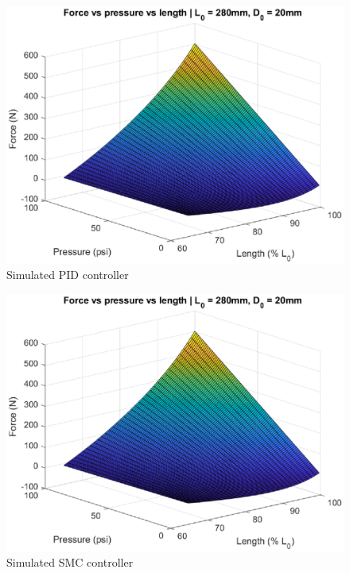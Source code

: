 \documentclass[11pt,a4paper]{article}
\begin{document}
\begin{figure}[!hbt]
    \centering
    \includegraphics[scale=0.8]{staticmap.eps}
    \caption{Simulated PID controller}
    \label{fig:simulated_pid}
\end{figure}
\begin{figure}[!hbt]
    \centering
    \includegraphics[scale=0.8]{staticmap.eps}
    \caption{Simulated SMC controller}
    \label{fig:simulated_smc}
\end{figure}
\end{document}
